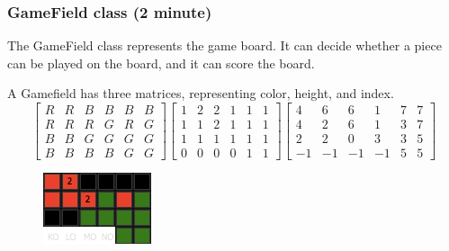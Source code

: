 \documentclass{beamer}
\begin{document}
\begin{frame}
\frametitle{GameField class (2 minute)}
The GameField class represents the game board. It can decide whether a piece can be played on the board, and it can score the board.

A Gamefield has three matrices, representing color, height, and index.
\tiny\[
  \begin{bmatrix}
    R & R & B & B & B & B \\ 
    R & R & R & G & R & G \\ 
    B & B & G & G & G & G \\ 
    B & B & B & B & G & G
  \end{bmatrix}
  \begin{bmatrix}
    1 & 2 & 2 & 1 & 1 & 1 \\ 
    1 & 1 & 2 & 1 & 1 & 1 \\ 
    1 & 1 & 1 & 1 & 1 & 1 \\ 
    0 & 0 & 0 & 0 & 1 & 1
  \end{bmatrix}
  \begin{bmatrix}
     4 &  6 &  6 &  1 &  7 &  7 \\ 
     4 &  2 &  6 &  1 &  3 &  7 \\ 
     2 &  2 &  0 &  3 &  3 &  5 \\ 
    -1 & -1 & -1 & -1 &  5 &  5
  \end{bmatrix}
\]
\begin{figure}
\includegraphics[width=0.4\linewidth]{7}
\end{figure}
\end{frame}
\end{document}
